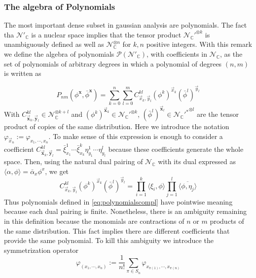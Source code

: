 \documentclass[12pt]{article}%
\begin{document}
\subsubsection{The algebra of Polynomials}
\label{sssec:Polynomials}

 The most important dense subset in gaussian analysis are polynomials.  The fact tha $\mathcal{N}'_{\mathbb{C}}$ is a nuclear space implies that the tensor product $ {\mathcal{N}_\mathbb{C}'}^{\otimes k}$ is unambiguously defined as well as $\mathcal{N}_{\mathbb{C}}^{\otimes n}$ for $k,n$ positive integers. With this remark we define the algebra of  polynomials $\mathcal{P}(\mathcal{N}'_\mathbb{C})$, with coefficients in $\mathcal{N}_{\mathbb{C}}$, as the set of polynomials of arbitrary degrees in which  a polynomial of degrees $(n,m)$ is  written as


 \begin{equation}
     \label{eq:polynomialscompl} 
     P_{nm}(\phi^{\mathbf{x}},\bar\phi^{\mathbf{x}})= \sum_{k=0}^n\sum_{l=0}^m C^{kl}_{\vec{x}_k,\vec{y}_l}(\phi^k)^{\vec{x}_k}(\bar\phi^l)^{\vec{y}_l}
 \end{equation}
 With $C^{kl}_{\vec{\mathbf{x}}_k,\vec{\mathbf{y}}_l}\in \mathcal{N}_{\mathbb{C}}^{\otimes k+l}$ and $(\phi^k)^{\vec{\mathbf{x}}_k}\in {\mathcal{N}_\mathbb{C}'}^{\otimes k}$, $(\bar\phi^l)^{\vec{\mathbf{x}}_l}\in {\mathcal{{N}_\mathbb{C}'}^*}^{\otimes l}$ are the tensor product of copies of the same distribution. Here we introduce the notation $\varphi_{\vec{x}_n}:=\varphi_{x_1,\cdots,x_n}$.
 {\color{blue} To make sense of this expression is enough to consider a coefficient $C^{kl}_{\vec{\mathbf{x}}_k,\vec{\mathbf{y}}_l}=\bar\xi^1_{x_1}\cdots\bar\xi^k_{x_k}{\eta}^1_{y_1}\cdots{\eta}^l_{y_l}$ because these coefficients generate the whole space. Then, using the natural dual pairing of $\mathcal{N}_{\mathbb{C}}$ with its dual expressed as $\langle \alpha,\phi \rangle= \bar\alpha_{x}\phi^x$, we get 
 $$
 C^{kl}_{\vec{x}_k,\vec{y}_l}(\phi^k)^{\vec{x}_k}
 (\bar\phi^l)^{\vec{y}_l}=\prod_{i=1}^k 
 \langle \xi_i,\phi \rangle
 \prod_{j=1}^l
  \overline{\langle \phi, \eta_j \rangle}
$$
 }
 Thus polynomials defined in \eqref{eq:polynomialscompl}  have pointwise meaning because each dual pairing is finite. Nonetheless, there is an ambiguity remaining in this definition  because the monomials are contractions of  $n$ or $m$ products of the same distribution. This fact implies there are different coefficients that provide the same polynomial. To kill this ambiguity we introduce the symmetrization operator 
    \begin{equation}
    \label{eq:symmetrization}
    \varphi_{(x_1,\cdots,x_n)}:=\frac{1}{n!}\sum_{\pi\in S_n}\varphi_{x_{\pi(1)},\cdots,x_{\pi(n)}}
    \end{equation}
\end{document}

